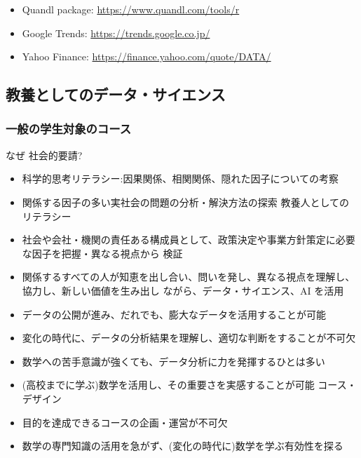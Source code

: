 \documentclass[
]{book}
\providecommand{\tightlist}{%
  \setlength{\itemsep}{0pt}\setlength{\parskip}{0pt}}
\theoremstyle{definition}
\theoremstyle{definition}
\theoremstyle{definition}
\theoremstyle{definition}
\theoremstyle{remark}
\begin{document}
\begin{itemize}
\tightlist
\item
  Quandl package: \url{https://www.quandl.com/tools/r}
\item
  Google Trends: \url{https://trends.google.co.jp/}
\item
  Yahoo Finance: \url{https://finance.yahoo.com/quote/DATA/}
\end{itemize}

\hypertarget{ux6559ux990aux3068ux3057ux3066ux306eux30c7ux30fcux30bfux30b5ux30a4ux30a8ux30f3ux30b9}{%
\subsection{教養としてのデータ・サイエンス}\label{ux6559ux990aux3068ux3057ux3066ux306eux30c7ux30fcux30bfux30b5ux30a4ux30a8ux30f3ux30b9}}

\hypertarget{ux4e00ux822cux306eux5b66ux751fux5bfeux8c61ux306eux30b3ux30fcux30b9}{%
\subsubsection{一般の学生対象のコース}\label{ux4e00ux822cux306eux5b66ux751fux5bfeux8c61ux306eux30b3ux30fcux30b9}}

なぜ 社会的要請?

\begin{itemize}
\tightlist
\item
  科学的思考リテラシー:因果関係、相関関係、隠れた因子についての考察
\item
  関係する因子の多い実社会の問題の分析・解決方法の探索
  教養人としてのリテラシー
\item
  社会や会社・機関の責任ある構成員として、政策決定や事業方針策定に必要な因子を把握・異なる視点から 検証
\item
  関係するすべての人が知恵を出し合い、問いを発し、異なる視点を理解し、協力し、新しい価値を生み出し ながら、データ・サイエンス、AI を活用
\item
  データの公開が進み、だれでも、膨大なデータを活用することが可能
\item
  変化の時代に、データの分析結果を理解し、適切な判断をすることが不可欠
\item
  数学への苦手意識が強くても、データ分析に力を発揮するひとは多い
\item
  (高校までに学ぶ)数学を活用し、その重要さを実感することが可能
  コース・デザイン
\item
  目的を達成できるコースの企画・運営が不可欠
\item
  数学の専門知識の活用を急がず、(変化の時代に)数学を学ぶ有効性を探る
\end{itemize}
\end{document}
